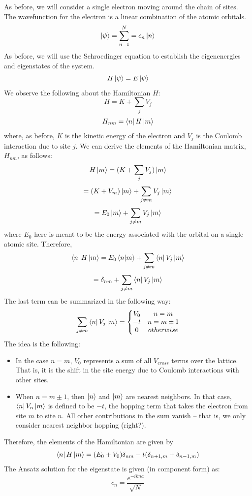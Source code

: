\documentclass{article}
\begin{document}
As before, we will consider a single electron moving around the chain of sites. The wavefunction for the electron is a linear combination of the atomic orbitals.
$$\ket{\psi} = \sum_{n = 1}^{N} = c_{n}\ket{n}$$
As before, we will use the Schroedinger equation to establish the eigenenergies and eigenstates of the system.
$$H\ket{\psi} = E\ket{\psi}$$
We observe the following about the Hamiltonian $H$:
$$ H = K + \sum_{j} V_{j} $$
$$ H_{nm} = \bra{n}H\ket{m} $$
where, as before, $K$ is the kinetic energy of the electron and $V_{j}$ is the Coulomb interaction due to site $j$. We can derive the elements of the
Hamiltonian matrix, $H_{nm}$, as follows:
$$ H\ket{m} = (K + \sum_{j}V_{j})\ket{m} $$
$$ = (K + V_{m})\ket{m} + \sum_{j \neq m}V_{j}\ket{m}$$
$$ = E_{0}\ket{m} + \sum_{j \neq m}V_{j}\ket{m} $$
where $E_{0}$ here is meant to be the energy associated with the orbital on a single atomic site. Therefore,
$$ \bra{n}H\ket{m} = E_{0}\bra{n}\ket{m} + \sum_{j \neq m}\bra{n}V_{j}\ket{m}$$
$$ = \delta_{nm} + \sum_{j \neq m}\bra{n}V_{j}\ket{m}$$
The last term can be summarized in the following way:
$$ \sum_{j \neq m}\bra{n}V_{j}\ket{m} = \left\{\begin{matrix}
                                                  V_{0}  &  n = m\\
                                                  -t  &  n = m \pm 1\\
                                                  0  & otherwise
                                                    \end{matrix}\right.$$
The idea is the following:
\begin{itemize}
\item In the case $n = m$, $V_{0}$ represents a sum of all $V_{cross}$ terms over the lattice. That is, it is the shift in the
      site energy due to Coulomb interactions with other sites.
\item When $n = m \pm 1$, then $\ket{n}$ and $\ket{m}$ are nearest neighbors. In that case, $\bra{n}V_{n}\ket{m}$ is defined to be $-t$,
the hopping term that takes the electron from site $m$ to site $n$. All other contributions in the sum vanish -- that is, we only consider
nearest neighbor hopping (right?).

\end{itemize}
Therefore, the elements of the Hamiltonian are given by
$$ \bra{n}H\ket{m} = (E_{0} + V_{0})\delta_{nm} - t(\delta_{n+1,m} + \delta_{n-1,m}) $$
The Ansatz solution for the eigenstate is given (in component form) as:
$$ c_{n} = \frac{e^{-ikna}}{\sqrt{N}} $$
\end{document}
